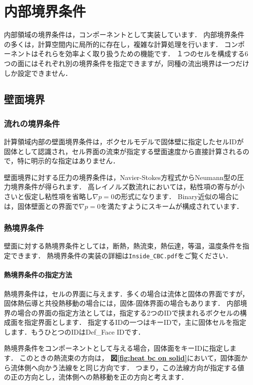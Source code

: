 \section{内部境界条件}
内部領域の境界条件は，コンポーネントとして実装しています．
内部境界条件の多くは，計算空間内に局所的に存在し，複雑な計算処理を行います．
コンポーネントはそれらを効率よく取り扱うための機能です．
１つのセルを構成する6つの面にはそれぞれ別の境界条件を指定できますが，同種の流出境界は一つだけしか設定できません．

%
\subsection{壁面境界}

\subsubsection{流れの境界条件}
計算領域内部の壁面境界条件は，ボクセルモデルで固体壁に指定したセルIDが固体として認識され，セル界面の流束が指定する壁面速度から直接計算されるので，特に明示的な指定はありません．

壁面境界に対する圧力の境界条件は，Navier-Stokes方程式からNeumann型の圧力境界条件が得られます．
高レイノルズ数流れにおいては，粘性項の寄与が小さいと仮定し粘性項を省略し$\nabla p=0$の形式になります．
Binary近似の場合には，固体壁面との界面で$\nabla p=0$を満たすようにスキームが構成されています．

%
\subsubsection{熱境界条件}
壁面に対する熱境界条件としては，断熱，熱流束，熱伝達，等温，温度条件を指定できます．
熱境界条件の実装の詳細は\verb|Inside_CBC.pdf|をご覧ください．

%
\hypertarget{tgt:spec of heat bc}{\paragraph{熱境界条件の指定方法}}
熱境界条件は，セルの界面に与えます．多くの場合は流体と固体の界面ですが，固体熱伝導と共役熱移動の場合には，固体-固体界面の場合もあります．
内部境界の場合の界面の指定方法としては，指定する2つのIDで挟まれるボクセルの構成面を指定界面とします．
指定するIDの一つはキーIDで，主に固体セルを指定します．もうひとつのIDはDef\_Face IDです．

熱境界条件をコンポーネントとして与える場合，固体面をキーIDに指定します．
このときの熱流束の方向は，
\textbf{図\ref{fig:heat bc on solid}}において，固体面から流体側へ向かう法線をと同じ方向です．
つまり，この法線方向が指定する値の正の方向とし，流体側への熱移動を正の方向と考えます．


